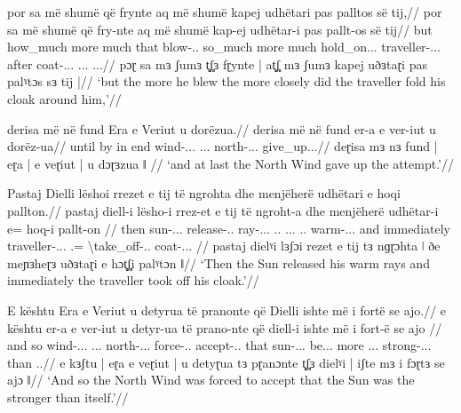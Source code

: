 \documentclass[a4paper,12pt]{article}
\newcommand{\gipa}{ɡ}
\begin{document}
\ex
\begingl
\glpreamble por sa më shumë që frynte aq më shumë kapej udhëtari pas palltos së tij,//
\gla por sa më shumë që fry-nte {} aq më shumë kap-ej udhëtar-i pas pallt-os së tij//
\glgloss but how\_much more much that blow-{\Impf.\Ind.\Tsg} {} so\_much more much hold\_on.{\Impf.\Ind.\Tsg} traveller-{\M.\Sg.\Nom.\Def} after coat-{\F.\Sg.\Abl.\Def} {\F.\Sg.\Abl.\Def} {\Tsg.\F.\Abl.\Poss}//
\glpm pɔɽ sa mɜ ʃumɜ t̻ʃ̻ɜ fɽynte | at̻ʃ̻ mɜ ʃumɜ kapej uðɜtaɽi pas palˠtɔs sɜ tij |//
\glft `but the more he blew the more closely did the traveller fold his cloak around him,'//
\endgl
\xe

\ex
\begingl
\glpreamble derisa më në fund Era e Veriut u dorëzua.//
\gla derisa më në fund {} er-a {} e ver-iut {} u dorëz-ua//
\glgloss until by in end {} wind-{\F.\Sg.\Nom.\Def} {} {\M.\Sg.\Gen.\Def} north-{\M.\Sg.\Gen.\Def} {} {\Aor} give\_up.{\Aor.\Ind.\Tsg}//
\glpm deɽisa mɜ nɜ fund | eɽa | e veɽiut | u dɔɽɜzua ǁ //
\glft `and at last the North Wind gave up the attempt.'//
\endgl
\xe

\ex
\begingl
\glpreamble Pastaj Dielli lëshoi rrezet e tij të ngrohta dhe menjëherë udhëtari e hoqi pallton.//
\gla pastaj diell-i lësho-i rrez-et e tij të ngroht-a {} dhe menjëherë udhëtar-i e= hoq-i pallt-on {}//
\glgloss then sun-{\M.\Sg.\Nom.\Def} release-{\Aor.\Ind.\Tsg} ray-{\F.\Pl.\Acc.\Def} {\M.\Sg.\Acc} {\M.\Sg.\Acc.\Prn} {\F.\Pl.\Acc} warm-{\F.\Pl.\Acc.\Def} {} and immediately traveller-{\M.\Sg.\Nom.\Def} {\Tsg.\Acc}= \Ind\textbackslash{}take\_off-{\Aor.\Ind.\Tsg} coat-{\F.\Sg.\Acc.\Def} {}//
\glpm pastaj dielˠi lɜʃɔi rezet e tij tɜ n\gipa{}ɽɔhta ǀ ðe meɲɜheɽɜ uðɜtaɽi e hɔt̻ʃ̻i palˠtɔn ǁ//
\glft `Then the Sun released his warm rays and immediately the traveller took off his cloak.'//
\endgl
\xe

\ex
\begingl
\glpreamble E kështu Era e Veriut u detyrua të pranonte që Dielli ishte më i fortë se ajo.//
\gla e kështu {} er-a e ver-iut {} u detyr-ua të prano-nte që diell-i {} ishte më i fort-ë se ajo {}//
\glgloss and so {} wind-{\F.\Sg.\Nom.\Def} {\M.\Sg.\Gen.\Def} north-{\M.\Sg.\Gen.\Def} {} {\Aor} force-{\Aor.\Ind.\Tsg} {\Sbjv} accept-{\Impf.\Sbjv.\Tsg} that sun-{\M.\Sg.\Nom.\Def} {} be.{\Impf.\Ind.\Tsg} more {\M.\Sg.\Nom.\Def} strong-{\M.\Sg.\Nom.\Def} than {\Tsg.\F.\Nom}//
\glpm e kɜʃtu | eɽa e veɽiut | u detyɽua tɜ pɽanɔnte t̻ʃ̻ɜ dielˠi | iʃte mɜ i fɔɽtɜ se ajɔ ǁ//
\glft `And so the North Wind was forced to accept that the Sun was the stronger than itself.'//
\endgl
\xe

\printglosses
\end{document}

